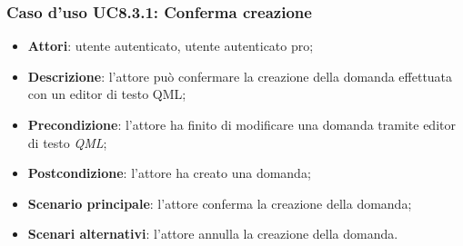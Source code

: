 		\subsubsection{Caso d'uso UC8.3.1: Conferma creazione}
		\begin{itemize}
			\item
			\textbf{Attori}: utente autenticato, utente autenticato pro;
			\item
			\textbf{Descrizione}: l'attore può confermare la creazione della domanda effettuata con un editor di testo QML;
			\item		
			\textbf{Precondizione}: l'attore ha finito di modificare una domanda tramite editor di testo \textit{QML};
			\item
			\textbf{Postcondizione}: l'attore ha creato una domanda;
			\item
			\textbf{Scenario principale}: l'attore conferma la creazione della domanda;		
			\item
			\textbf{Scenari alternativi}: l'attore annulla la creazione della domanda.	
		\end{itemize}
	
